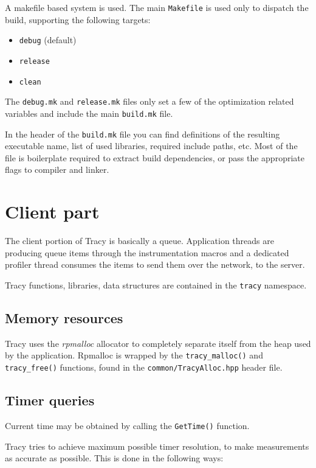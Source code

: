 \documentclass[hidelinks,titlepage,a4paper]{article}
\begin{document}
A makefile based system is used. The main \texttt{Makefile} is used only to dispatch the build, supporting the following targets:

\begin{itemize}
\item \texttt{debug} (default)
\item \texttt{release}
\item \texttt{clean}
\end{itemize}

The \texttt{debug.mk} and \texttt{release.mk} files only set a few of the optimization related variables and include the main \texttt{build.mk} file.

In the header of the \texttt{build.mk} file you can find definitions of the resulting executable name, list of used libraries, required include paths, etc. Most of the file is boilerplate required to extract build dependencies, or pass the appropriate flags to compiler and linker.

\section{Client part}

The client portion of Tracy is basically a queue. Application threads are producing queue items through the instrumentation macros and a dedicated profiler thread consumes the items to send them over the network, to the server.

Tracy functions, libraries, data structures are contained in the \texttt{tracy} namespace.

\subsection{Memory resources}

Tracy uses the \emph{rpmalloc} allocator to completely separate itself from the heap used by the application. Rpmalloc is wrapped by the \texttt{tracy\_malloc()} and \texttt{tracy\_free()} functions, found in the \texttt{common/TracyAlloc.hpp} header file.

\subsection{Timer queries}
\label{timerqueries}

Current time may be obtained by calling the \texttt{GetTime()} function.

Tracy tries to achieve maximum possible timer resolution, to make measurements as accurate as possible. This is done in the following ways:
\end{document}
